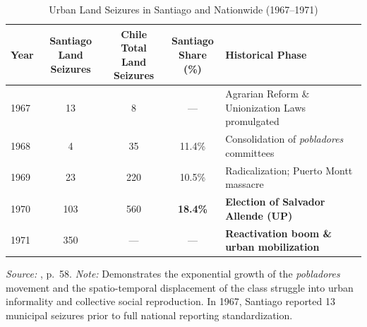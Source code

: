 \begin{table}[htbp]
\centering
\small
\caption{Urban Land Seizures in Santiago and Nationwide (1967--1971)}
\label{tab:urban_land_seizures_murphy}
\begin{tabularx}{\textwidth}{l c c c X}
\toprule
\textbf{Year} & \shortstack{\textbf{Santiago Land}\\\textbf{Seizures}} & \shortstack{\textbf{Chile Total}\\\textbf{Land Seizures}} & \shortstack{\textbf{Santiago}\\\textbf{Share (\%)}} & \textbf{Historical Phase} \\
\midrule
1967 & 13 & 8 & --- & Agrarian Reform \& Unionization Laws promulgated \\
1968 & 4 & 35 & 11.4\% & Consolidation of \textit{pobladores} committees \\
1969 & 23 & 220 & 10.5\% & Radicalization; Puerto Montt massacre \\
1970 & 103 & 560 & \textbf{18.4\%} & \textbf{Election of Salvador Allende (UP)} \\
1971 & 350 & --- & --- & \textbf{Reactivation boom \& urban mobilization} \\
\bottomrule
\end{tabularx}
\begin{minipage}{\textwidth}
\vspace{0.3em}
\footnotesize
\textit{Source:} \citet{Murphy2015}, p.~58. \textit{Note:} Demonstrates the exponential growth of the \textit{pobladores} movement and the spatio-temporal displacement of the class struggle into urban informality and collective social reproduction. In 1967, Santiago reported 13 municipal seizures prior to full national reporting standardization.
\end{minipage}
\end{table}
